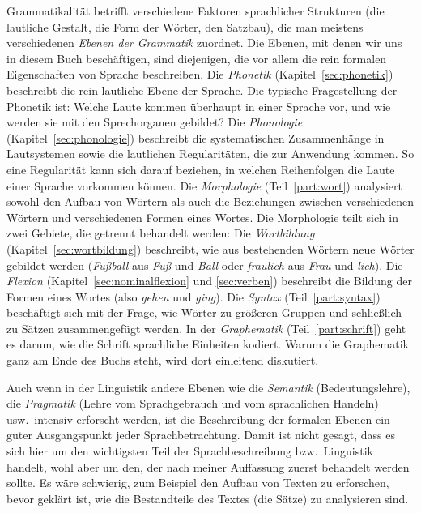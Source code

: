 Grammatikalität betrifft verschiedene Faktoren sprachlicher Strukturen (\zB die lautliche Gestalt, die Form der Wörter, den Satzbau), die man meistens verschiedenen \textit{Ebenen der Grammatik} zuordnet.
Die Ebenen, mit denen wir uns in diesem Buch beschäftigen, sind diejenigen, die vor allem die rein formalen Eigenschaften von Sprache beschreiben.
Die \textit{Phonetik} (Kapitel~\ref{sec:phonetik}) beschreibt die rein lautliche Ebene der Sprache.
Die typische Fragestellung der Phonetik ist:
Welche Laute kommen überhaupt in einer Sprache vor, und wie werden sie mit den Sprechorganen gebildet?
Die \textit{Phonologie} (Kapitel~\ref{sec:phonologie}) beschreibt die systematischen Zusammenhänge in Lautsystemen sowie die lautlichen Regularitäten, die zur Anwendung kommen.
So eine Regularität kann sich \zB darauf beziehen, in welchen Reihenfolgen die Laute einer Sprache vorkommen können.
Die \textit{Morphologie} (Teil~\ref{part:wort}) analysiert sowohl den Aufbau von Wörtern als auch die Beziehungen zwischen verschiedenen Wörtern und verschiedenen Formen eines Wortes.
Die Morphologie teilt sich in zwei Gebiete, die getrennt behandelt werden:
Die \textit{Wortbildung} (Kapitel~\ref{sec:wortbildung}) beschreibt, wie aus bestehenden Wörtern neue Wörter gebildet werden (\zB \textit{Fußball} aus \textit{Fuß} und \textit{Ball} oder \textit{fraulich} aus \textit{Frau} und \textit{lich}).
Die \textit{Flexion} (Kapitel~\ref{sec:nominalflexion} und \ref{sec:verben}) beschreibt die Bildung der Formen eines Wortes (also \zB \textit{gehen} und \textit{ging}). 
Die \textit{Syntax} (Teil~\ref{part:syntax}) beschäftigt sich mit der Frage, wie Wörter zu größeren Gruppen und schließlich zu Sätzen zusammengefügt werden.
In der \textit{Graphematik} (Teil~\ref{part:schrift}) geht es darum, wie die Schrift sprachliche Einheiten kodiert.
Warum die Graphematik ganz am Ende des Buchs steht, wird dort einleitend diskutiert.

Auch wenn in der Linguistik andere Ebenen wie die \textit{Semantik} (Bedeutungslehre), die \textit{Pragmatik} (Lehre vom Sprachgebrauch und vom sprachlichen Handeln) usw.\ intensiv erforscht werden, ist die Beschreibung der formalen Ebenen ein guter Ausgangspunkt jeder Sprachbetrachtung.
Damit ist nicht gesagt, dass es sich hier um den wichtigsten Teil der Sprachbeschreibung bzw.\ Linguistik handelt, wohl aber um den, der nach meiner Auffassung zuerst behandelt werden sollte.
Es wäre schwierig, zum Beispiel den Aufbau von Texten zu erforschen, bevor geklärt ist, wie die Bestandteile des Textes (die Sätze) zu analysieren sind.

